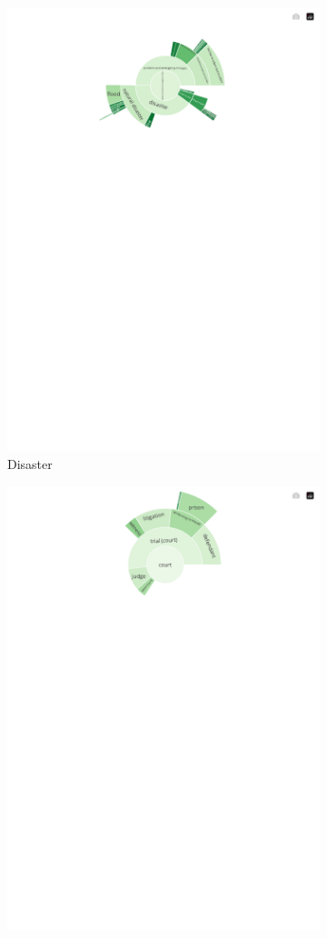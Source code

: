 \begin{figure}[!htbp]
\begin{subfigure}{0.45\textwidth}
		\includegraphics[trim={0 0 0 0},clip,width=0.8\linewidth]{figures/baly_iptc_weighted_prop_leaning_corr_tfidf_zoom_disaster.pdf}
		\caption{Disaster}
            \label{fig:baly_iptc_weighted_prop_leaning_corr_tfidf_zoom_disaster}
	\end{subfigure}
	\begin{subfigure}{0.45\textwidth}
            \centering
		\includegraphics[trim={0 0 0 0},clip,width=0.8\linewidth]{figures/baly_iptc_weighted_prop_leaning_corr_tfidf_zoom_court.pdf}

\end{subfigure}
\end{figure}
